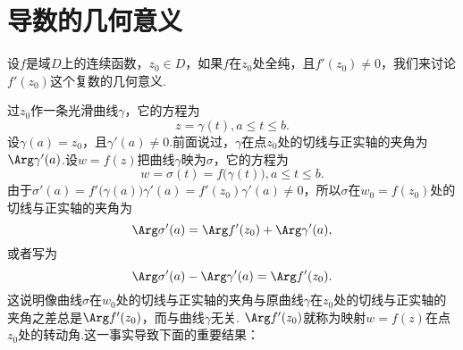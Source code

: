 \section{导数的几何意义\label{sec2.3}}
设$f$是域$D$上的连续函数，$z_0\in D$，如果$f$在$z_0$处全纯，且$f'(z_0)\ne0$，我们来讨论$f'(z_0)$这个复数的几何意义.

过$z_0$作一条光滑曲线$\gamma$，它的方程为
\[z=\gamma(t),a\le t\le b.\]
设$\gamma(a)=z_0$，且$\gamma'(a)\ne0$.前面说过，$\gamma$在点$z_0$处的切线与正实轴的夹角为$\Arg\gamma'(a)$.设$w=f(z)$把曲线$\gamma$映为$\sigma$，它的方程为\[w=\sigma(t)=f\big(\gamma(t)\big),a\le t\le b.\]
由于$\sigma'(a)=f'\big(\gamma(a)\big)\gamma'(a)=f'(z_0)\gamma'(a)\ne0$，所以$\sigma$在$w_0=f(z_0)$处的切线与正实轴的夹角为
\[\Arg\sigma'(a)=\Arg f'(z_0)+\Arg \gamma'(a),\]
或者写为
\begin{equation}\label{eq2.3.1}
\Arg\sigma'(a)-\Arg \gamma'(a)=\Arg f'(z_0).
\end{equation}
这说明像曲线$\sigma$在$w_0$处的切线与正实轴的夹角与原曲线$\gamma$在$z_0$处的切线与正实轴的夹角之差总是$\Arg f'(z_0)$，而与曲线$\gamma$无关.
$\Arg f'(z_0)$就称为映射$w=f(z)$在点$z_0$处的转动角.这一事实导致下面的重要结果：


